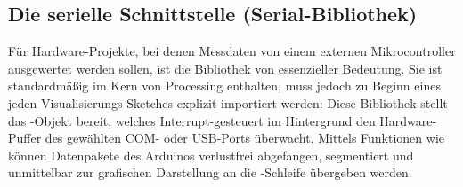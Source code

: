 \subsection{Die serielle Schnittstelle (Serial-Bibliothek)}
Für Hardware-Projekte, bei denen Messdaten von einem externen Mikrocontroller ausgewertet werden sollen, ist die Bibliothek  von essenzieller Bedeutung. Sie ist standardmä\ss ig im Kern von Processing enthalten, muss jedoch zu Beginn eines jeden Visualisierungs-Sketches explizit importiert werden:
\medskip
{}
\medskip
Diese Bibliothek stellt das -Objekt bereit, welches Interrupt-gesteuert im Hintergrund den Hardware-Puffer des gewählten COM- oder USB-Ports überwacht. Mittels Funktionen wie  können Datenpakete des Arduinos verlustfrei abgefangen, segmentiert und unmittelbar zur grafischen Darstellung an die -Schleife übergeben werden.